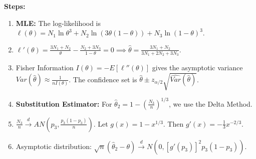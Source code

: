 \begin{solution}
\textbf{Steps:}
\begin{enumerate}
    \item \textbf{MLE:} The log-likelihood is $\ell(\theta) = N_1 \ln \theta^3 + N_2 \ln(3\theta(1-\theta)) + N_3 \ln(1-\theta)^3$.
    \item $\ell'(\theta) = \frac{3N_1+N_2}{\theta} - \frac{N_2+3N_3}{1-\theta} = 0 \implies \hat{\theta} = \frac{3N_1+N_2}{3N_1+2N_2+3N_3}$.
    \item Fisher Information $I(\theta) = -E[\ell''(\theta)]$ gives the asymptotic variance $Var(\hat{\theta}) \approx \frac{1}{n I(\theta)}$. The confidence set is $\hat{\theta} \pm z_{\alpha/2} \sqrt{\widehat{Var}(\hat{\theta})}$.
    \item \textbf{Substitution Estimator:} For $\hat{\theta}_2 = 1 - (\frac{N_3}{n})^{1/3}$, we use the Delta Method.
    \item $\frac{N_3}{n} \xrightarrow{d} AN(p_3, \frac{p_3(1-p_3)}{n})$. Let $g(x) = 1 - x^{1/3}$. Then $g'(x) = -\frac{1}{3} x^{-2/3}$.
    \item Asymptotic distribution: $\sqrt{n}(\hat{\theta}_2 - \theta) \xrightarrow{d} N(0, [g'(p_3)]^2 p_3(1-p_3))$.
\end{enumerate}
\end{solution}

